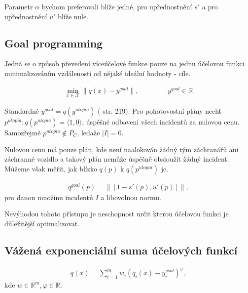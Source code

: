 Parametr $\alpha$ bychom preferovali blíže jedné, pro upřednostnění $s'$ a pro upřednostnění $u'$ blíže nule.

\subsection{Goal programming}\label{kap:goalP}

Jedná se o způsob převedení víceúčelové funkce pouze na jednu účelovou funkci minimalizováním vzdálenosti od nějaké ideální hodnoty - cíle. 

\begin{definice}
  \begin{align*}
    \min_{x \in \mathcal{X}} \| q(x) - y^{goal} \|, \hspace{50pt} y^{goal} \in \mathbb{R}
  \end{align*}
\end{definice}

Standardně $y^{goal} = q(y^{utopia})$ (\cite{AlgOptBook} str. 219).
Pro pohotovostní plány nechť $p^{utopia} \colon q(p^{utopia}) = \langle 1, 0 \rangle$, úspěšné odbavení všech incidentů za nulovou cenu.
Samozřejmě $p^{utopia} \not \in P_C$, ledaže $|I| = 0$.

Nulovou cenu má pouze plán, kde není naalokován žádný tým záchranářů ani záchranné vozidlo a takový plán nemůže úspěšně obsloužit žádný incident. 
Můžeme však měřit, jak blízko $q(p)$ k $q(p^{utopia})$ je.

\begin{definice}
  \begin{align*}
    q^{goal}(p) = \| [1 - s'(p), u'(p)] \|,
  \end{align*}
  pro danou množinu incidentů $I$ a libovolnou normu.
\end{definice}

Nevýhodou tohoto přístupu je neschopnost určit kterou účelovou funkci je důležitější optimalizovat.

\subsection{Vážená exponenciální suma účelových funkcí}\label{kap:vazenaSumUcF}

\begin{definice}
  \begin{align*}
    q(x) = \sum_{i=1}^{m} w_i (q_i(x) - y_i^{goal})^\varphi,
  \end{align*}
  kde $w \in \mathbb{R}^m, \varphi \in \mathbb{R}$.
\end{definice}


